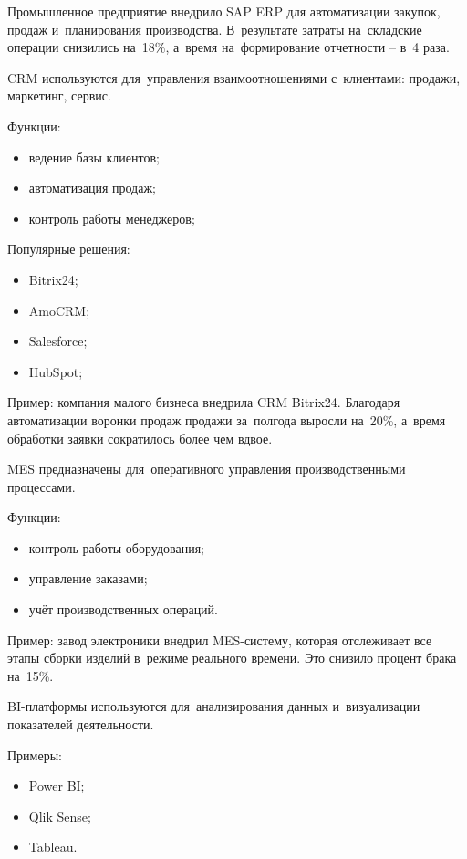 \documentclass{ou}
\begin{document}
Промышленное предприятие внедрило SAP ERP для автоматизации закупок, продаж и~планирования производства. В~результате затраты на~складские операции снизились на~18\%, а~время на~формирование отчетности -- в~4 раза.

CRM используются для~управления взаимоотношениями с~клиентами: продажи, маркетинг, сервис.

Функции:
\begin{itemize}[label=-, leftmargin=0em, itemindent=3.35em, nosep]
\item ведение базы клиентов;
\item автоматизация продаж;
\item контроль работы менеджеров;
\end{itemize}

Популярные решения:
\begin{itemize}[label=-, leftmargin=0em, itemindent=3.35em, nosep]
\item Bitrix24;
\item AmoCRM;
\item Salesforce;
\item HubSpot;
\end{itemize}

Пример: компания малого бизнеса внедрила CRM Bitrix24. Благодаря автоматизации воронки продаж продажи за~полгода выросли на~20\%, а~время обработки заявки сократилось более чем вдвое.

MES предназначены для~оперативного управления производственными процессами.

Функции:
\begin{itemize}[label=-, leftmargin=0em, itemindent=3.35em, nosep]
\item контроль работы оборудования;
\item управление заказами;
\item учёт производственных операций.
\end{itemize}

Пример: завод электроники внедрил MES-систему, которая отслеживает все этапы сборки изделий в~режиме реального времени. Это снизило процент брака на~15\%.

BI-платформы используются для~анализирования данных и~визуализации показателей деятельности.

Примеры:
\begin{itemize}[label=-, leftmargin=0em, itemindent=3.35em, nosep]
\item Power BI;
\item Qlik Sense;
\item Tableau.
\end{itemize}
\end{document}
